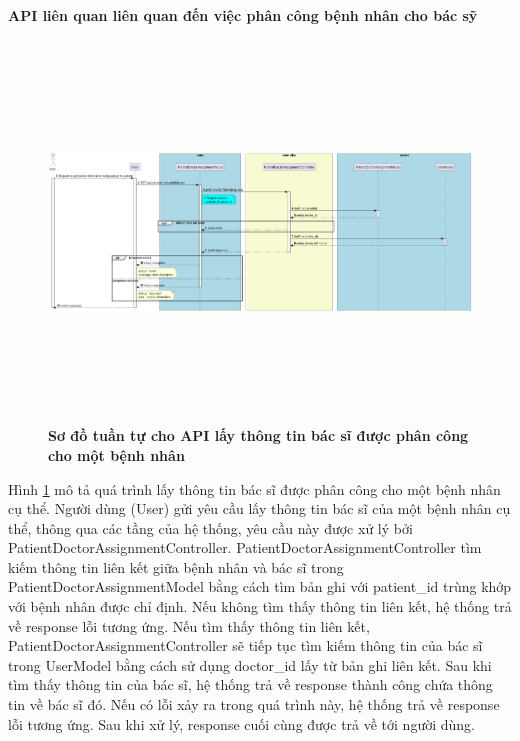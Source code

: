 
\paragraph{API liên quan liên quan đến việc phân công bệnh nhân cho bác sỹ}
\mbox{}


\begin{figure}[H]
  \centering
  \includegraphics[width=16cm,height=10cm]{Images/server/sequence/server/getDoctorByPatient.png}
  \caption[Sơ đồ tuần tự cho API lấy thông tin bác sĩ được phân công cho một bệnh nhân ]{\bfseries \fontsize{12pt}{0pt}
  \selectfont Sơ đồ tuần tự cho API lấy thông tin bác sĩ được phân công cho một bệnh nhân }
  \label{getDoctorByPatient} %
\end{figure}
Hình \ref{getDoctorByPatient} mô tả quá trình lấy thông tin bác sĩ được phân công cho một bệnh nhân cụ thể. Người dùng (User) gửi yêu cầu lấy thông tin bác sĩ của một bệnh nhân cụ thể, thông qua các tầng của hệ thống, yêu cầu này được xử lý bởi PatientDoctorAssignmentController. PatientDoctorAssignmentController tìm kiếm thông tin liên kết giữa bệnh nhân và bác sĩ trong PatientDoctorAssignmentModel bằng cách tìm bản ghi với patient\_id trùng khớp với bệnh nhân được chỉ định. Nếu không tìm thấy thông tin liên kết, hệ thống trả về response lỗi tương ứng. Nếu tìm thấy thông tin liên kết, PatientDoctorAssignmentController sẽ tiếp tục tìm kiếm thông tin của bác sĩ trong UserModel bằng cách sử dụng doctor\_id lấy từ bản ghi liên kết. Sau khi tìm thấy thông tin của bác sĩ, hệ thống trả về response thành công chứa thông tin về bác sĩ đó. Nếu có lỗi xảy ra trong quá trình này, hệ thống trả về response lỗi tương ứng. Sau khi xử lý, response cuối cùng được trả về tới người dùng.


